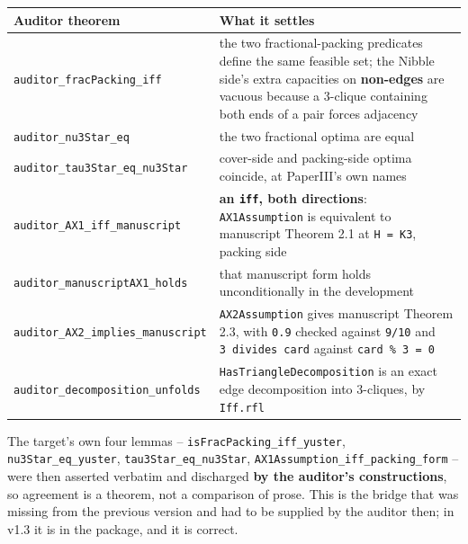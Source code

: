 \documentclass[
  10pt,
]{article}
\newcounter{none} %
\begin{document}
{\def\LTcaptype{none} %
\begin{longtable}[]{@{}
  >{\raggedright\arraybackslash}p{}
  >{\raggedright\arraybackslash}p{}@{}}
\toprule\noalign{}
\begin{minipage}[b]{\linewidth}\raggedright
Auditor theorem
\end{minipage} & \begin{minipage}[b]{\linewidth}\raggedright
What it settles
\end{minipage} \\
\midrule\noalign{}
\endhead
\bottomrule\noalign{}
\endlastfoot
\texttt{auditor\_fracPacking\_iff} & the two fractional-packing
predicates define the same feasible set; the Nibble side's extra
capacities on \textbf{non-edges} are vacuous because a 3-clique
containing both ends of a pair forces adjacency \\
\texttt{auditor\_nu3Star\_eq} & the two fractional optima are equal \\
\texttt{auditor\_tau3Star\_eq\_nu3Star} & cover-side and packing-side
optima coincide, at PaperIII's own names \\
\texttt{auditor\_AX1\_iff\_manuscript} & \textbf{an \texttt{iff}, both
directions}: \texttt{AX1Assumption} is equivalent to manuscript Theorem
2.1 at \texttt{H\ =\ K3}, packing side \\
\texttt{auditor\_manuscriptAX1\_holds} & that manuscript form holds
unconditionally in the development \\
\texttt{auditor\_AX2\_implies\_manuscript} & \texttt{AX2Assumption}
gives manuscript Theorem 2.3, with \texttt{0.9} checked against
\texttt{9/10} and \texttt{3\ divides\ card} against
\texttt{card\ \%\ 3\ =\ 0} \\
\texttt{auditor\_decomposition\_unfolds} &
\texttt{HasTriangleDecomposition} is an exact edge decomposition into
3-cliques, by \texttt{Iff.rfl} \\
\end{longtable}
}

The target's own four lemmas -- \texttt{isFracPacking\_iff\_yuster},
\texttt{nu3Star\_eq\_yuster}, \texttt{tau3Star\_eq\_nu3Star},
\texttt{AX1Assumption\_iff\_packing\_form} -- were then asserted
verbatim and discharged \textbf{by the auditor's constructions}, so
agreement is a theorem, not a comparison of prose. This is the bridge
that was missing from the previous version and had to be supplied by the
auditor then; in v1.3 it is in the package, and it is correct.
\end{document}
